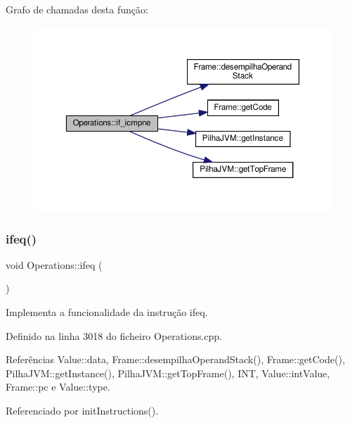 Grafo de chamadas desta função\+:\nopagebreak
\begin{figure}[H]
\begin{center}
\leavevmode
\includegraphics[width=350pt]{classOperations_a52dca630766e37bbaf0e7439c0335273_cgraph}
\end{center}
\end{figure}
\mbox{\label{classOperations_ad33c8bdb5f67bdbf0885bb51990f99ee}} 
\subsubsection{\texorpdfstring{ifeq()}{ifeq()}}
{\footnotesize\ttfamily void Operations\+::ifeq (\begin{DoxyParamCaption}{ }\end{DoxyParamCaption})\hspace{0.3cm}{\ttfamily [private]}}



Implementa a funcionalidade da instrução ifeq. 



Definido na linha 3018 do ficheiro Operations.\+cpp.



Referências Value\+::data, Frame\+::desempilha\+Operand\+Stack(), Frame\+::get\+Code(), Pilha\+J\+V\+M\+::get\+Instance(), Pilha\+J\+V\+M\+::get\+Top\+Frame(), I\+NT, Value\+::int\+Value, Frame\+::pc e Value\+::type.



Referenciado por init\+Instructions().

